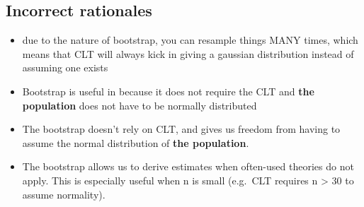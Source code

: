\documentclass[letterpaper,9pt,twoside,printwatermark=false]{pinp}
\providecommand{\tightlist}{%
  \setlength{\itemsep}{0pt}\setlength{\parskip}{0pt}}
\begin{document}
\subsection{Incorrect rationales}\label{incorrect-rationales-6}

\begin{itemize}
\tightlist
\item
  due to the nature of bootstrap, you can resample things MANY times,
  which means that CLT will always kick in giving a gaussian
  distribution instead of assuming one exists
\item
  Bootstrap is useful in because it does not require the CLT and
  \textbf{the population} does not have to be normally distributed
\item
  The bootstrap doesn't rely on CLT, and gives us freedom from having to
  assume the normal distribution of \textbf{the population}.
\item
  The bootstrap allows us to derive estimates when often-used theories
  do not apply. This is especially useful when n is small (e.g.~CLT
  requires n \textgreater{} 30 to assume normality).
\end{itemize}





\end{document}
